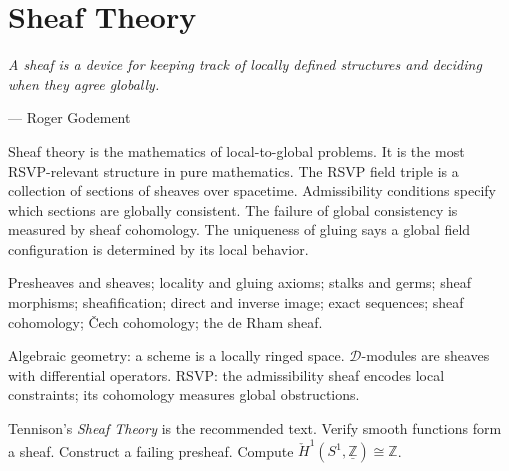 \documentclass[12pt, twoside, openright, a4paper]{book}
\newcommand{\sidenote}[1]{\marginnote{#1}}
\newcommand{\Z}{\mathbb{Z}}
\newcommand{\chapterepigraph}[2]{%
  \vspace{-8pt}\begin{center}\begin{minipage}{0.78\textwidth}
  \small\itshape #1\begin{flushright}--- #2\end{flushright}
  \end{minipage}\end{center}\vspace{10pt}}
\begin{document}
\chapter{Sheaf Theory}
\chapterepigraph{A sheaf is a device for keeping track of locally defined structures
and deciding when they agree globally.}{Roger Godement}
\sidenote{Recommended:\\Tennison,\\\textit{Sheaf Theory}}
\label{ch:sheaves}

\begin{motivation}
Sheaf theory is the mathematics of local-to-global problems.
It is the most RSVP-relevant structure in pure mathematics.
The RSVP field triple is a collection of sections of sheaves over spacetime.
Admissibility conditions specify which sections are globally consistent.
The failure of global consistency is measured by sheaf cohomology.
The uniqueness of gluing says a global field configuration is determined by its local behavior.
\end{motivation}

\begin{structures}
Presheaves and sheaves; locality and gluing axioms; stalks and germs; sheaf morphisms; sheafification; direct and inverse image; exact sequences; sheaf cohomology; \v{C}ech cohomology; the de Rham sheaf.
\end{structures}

\begin{dependencies}
Algebraic geometry: a scheme is a locally ringed space.
$\mathcal{D}$-modules are sheaves with differential operators.
RSVP: the admissibility sheaf encodes local constraints; its cohomology measures global obstructions.
\end{dependencies}

\begin{exercises_box}
Tennison's \textit{Sheaf Theory} is the recommended text.
Verify smooth functions form a sheaf.
Construct a failing presheaf.
Compute $\check{H}^1(S^1, \underline{\Z}) \cong \Z$.
\end{exercises_box}
\end{document}
